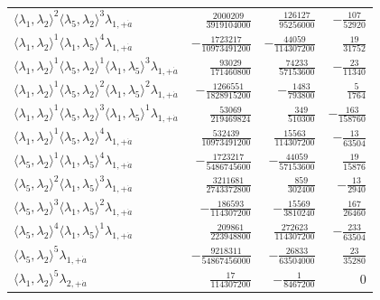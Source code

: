 \begin{longtable}{@{}lrrr@{}}
$\langle\lambda_1,\lambda_2\rangle^{2}\langle\lambda_5,\lambda_2\rangle^{3}\lambda_{1,+\dot a}$ & $\frac{2000209}{3919104000}$ & $\frac{126127}{95256000}$ & $-\frac{107}{52920}$ \\
$\langle\lambda_1,\lambda_2\rangle^{1}\langle\lambda_1,\lambda_5\rangle^{4}\lambda_{1,+\dot a}$ & $-\frac{1723217}{10973491200}$ & $-\frac{44059}{114307200}$ & $\frac{19}{31752}$ \\
$\langle\lambda_1,\lambda_2\rangle^{1}\langle\lambda_5,\lambda_2\rangle^{1}\langle\lambda_1,\lambda_5\rangle^{3}\lambda_{1,+\dot a}$ & $\frac{93029}{171460800}$ & $\frac{74233}{57153600}$ & $-\frac{23}{11340}$ \\
$\langle\lambda_1,\lambda_2\rangle^{1}\langle\lambda_5,\lambda_2\rangle^{2}\langle\lambda_1,\lambda_5\rangle^{2}\lambda_{1,+\dot a}$ & $-\frac{1266551}{1828915200}$ & $-\frac{1483}{793800}$ & $\frac{5}{1764}$ \\
$\langle\lambda_1,\lambda_2\rangle^{1}\langle\lambda_5,\lambda_2\rangle^{3}\langle\lambda_1,\lambda_5\rangle^{1}\lambda_{1,+\dot a}$ & $\frac{53069}{219469824}$ & $\frac{349}{510300}$ & $-\frac{163}{158760}$ \\
$\langle\lambda_1,\lambda_2\rangle^{1}\langle\lambda_5,\lambda_2\rangle^{4}\lambda_{1,+\dot a}$ & $\frac{532439}{10973491200}$ & $\frac{15563}{114307200}$ & $-\frac{13}{63504}$ \\
$\langle\lambda_5,\lambda_2\rangle^{1}\langle\lambda_1,\lambda_5\rangle^{4}\lambda_{1,+\dot a}$ & $-\frac{1723217}{5486745600}$ & $-\frac{44059}{57153600}$ & $\frac{19}{15876}$ \\
$\langle\lambda_5,\lambda_2\rangle^{2}\langle\lambda_1,\lambda_5\rangle^{3}\lambda_{1,+\dot a}$ & $\frac{3211681}{2743372800}$ & $\frac{859}{302400}$ & $-\frac{13}{2940}$ \\
$\langle\lambda_5,\lambda_2\rangle^{3}\langle\lambda_1,\lambda_5\rangle^{2}\lambda_{1,+\dot a}$ & $-\frac{186593}{114307200}$ & $-\frac{15569}{3810240}$ & $\frac{167}{26460}$ \\
$\langle\lambda_5,\lambda_2\rangle^{4}\langle\lambda_1,\lambda_5\rangle^{1}\lambda_{1,+\dot a}$ & $\frac{209861}{223948800}$ & $\frac{272623}{114307200}$ & $-\frac{233}{63504}$ \\
$\langle\lambda_5,\lambda_2\rangle^{5}\lambda_{1,+\dot a}$ & $-\frac{9218311}{54867456000}$ & $-\frac{26833}{63504000}$ & $\frac{23}{35280}$ \\
$\langle\lambda_1,\lambda_2\rangle^{5}\lambda_{2,+\dot a}$ & $\frac{17}{114307200}$ & $-\frac{1}{8467200}$ & $0$ \\

\end{longtable}
